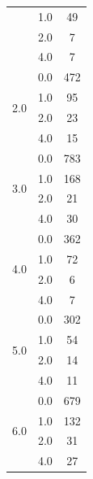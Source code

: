 \begin{longtable}{|c|c|c|c|c|}
& \multicolumn{2}{c|}{1.0} & \multicolumn{2}{c|}{49} \\
& \multicolumn{2}{c|}{2.0} & \multicolumn{2}{c|}{7} \\
& \multicolumn{2}{c|}{4.0} & \multicolumn{2}{c|}{7} \\
\hline
\multirow{4}{*}{2.0} & \multicolumn{2}{c|}{0.0} & \multicolumn{2}{c|}{472} \\
& \multicolumn{2}{c|}{1.0} & \multicolumn{2}{c|}{95} \\
& \multicolumn{2}{c|}{2.0} & \multicolumn{2}{c|}{23} \\
& \multicolumn{2}{c|}{4.0} & \multicolumn{2}{c|}{15} \\
\hline
\multirow{4}{*}{3.0} & \multicolumn{2}{c|}{0.0} & \multicolumn{2}{c|}{783} \\
& \multicolumn{2}{c|}{1.0} & \multicolumn{2}{c|}{168} \\
& \multicolumn{2}{c|}{2.0} & \multicolumn{2}{c|}{21} \\
& \multicolumn{2}{c|}{4.0} & \multicolumn{2}{c|}{30} \\
\hline
\multirow{4}{*}{4.0} & \multicolumn{2}{c|}{0.0} & \multicolumn{2}{c|}{362} \\
& \multicolumn{2}{c|}{1.0} & \multicolumn{2}{c|}{72} \\
& \multicolumn{2}{c|}{2.0} & \multicolumn{2}{c|}{6} \\
& \multicolumn{2}{c|}{4.0} & \multicolumn{2}{c|}{7} \\
\hline
\multirow{4}{*}{5.0} & \multicolumn{2}{c|}{0.0} & \multicolumn{2}{c|}{302} \\
& \multicolumn{2}{c|}{1.0} & \multicolumn{2}{c|}{54} \\
& \multicolumn{2}{c|}{2.0} & \multicolumn{2}{c|}{14} \\
& \multicolumn{2}{c|}{4.0} & \multicolumn{2}{c|}{11} \\
\hline
\multirow{4}{*}{6.0} & \multicolumn{2}{c|}{0.0} & \multicolumn{2}{c|}{679} \\
& \multicolumn{2}{c|}{1.0} & \multicolumn{2}{c|}{132} \\
& \multicolumn{2}{c|}{2.0} & \multicolumn{2}{c|}{31} \\
& \multicolumn{2}{c|}{4.0} & \multicolumn{2}{c|}{27} \\
\hline

\end{longtable}
